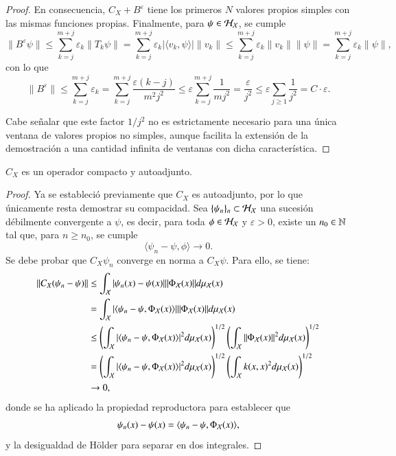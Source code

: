 \begin{proof}
    En consecuencia, $C_X + B^\varepsilon$ tiene los primeros $N$ valores propios simples con las mismas funciones propias. Finalmente, para $\psi \in \mathcal{H}_{\mathcal{X}}$, se cumple
    \[
    \| B^\varepsilon \psi \| \leq \sum_{k=j}^{m+j} \varepsilon_k \| T_k \psi \| = \sum_{k=j}^{m+j} \varepsilon_k | \langle v_k, \psi \rangle | \| v_k \| \leq \sum_{k=j}^{m+j} \varepsilon_k \| v_k \| \| \psi \| = \sum_{k=j}^{m+j} \varepsilon_k \| \psi \|,
    \]
    con lo que
    \[
    \| B^\varepsilon \| \leq \sum_{k=j}^{m+j} \varepsilon_k  = \sum_{k=j}^{m+j} \frac{\varepsilon (k-j)}{m^2 j^2} \leq \varepsilon \sum_{k=j}^{m+j} \frac{1}{m j^2} = \frac{\varepsilon}{j^2} \leq \varepsilon \sum_{j \geq 1} \frac{1}{j^2} = C \cdot \varepsilon.
    \]

    Cabe señalar que este factor $1/j^2$ no es estrictamente necesario para una única ventana de valores propios no simples, aunque facilita la extensión de la demostración a una cantidad infinita de ventanas con dicha característica.
\end{proof}

\begin{lema}
    $C_X$ es un operador compacto y autoadjunto.
\end{lema}

\begin{proof}
    Ya se estableció previamente que $C_X$ es autoadjunto, por lo que únicamente resta demostrar su compacidad. Sea $\{ \psi_n \}_n \subset \mathcal{H}_{\mathcal{X}}$ una sucesión débilmente convergente a $\psi$, es decir, para toda $\phi \in \mathcal{H}_{\mathcal{X}}$ y $\varepsilon > 0$, existe un $n_0 \in \mathbb{N}$ tal que, para $n \geq n_0$, se cumple
    \[
    \langle \psi_n - \psi, \phi \rangle \to 0.
    \]
    Se debe probar que $C_X \psi_n$ converge en norma a $C_X \psi$. Para ello, se tiene:
    \[
    \begin{aligned}
        \| C_X (\psi_n - \psi) \| & \leq \int_{\mathcal{X}} | \psi_n (x) - \psi (x) | \| \Phi_{\mathcal{X}} (x) \| d \mu_{\mathcal{X}} (x) \\
        & = \int_{\mathcal{X}} | \langle \psi_n - \psi, \Phi_{\mathcal{X}} (x) \rangle | \| \Phi_{\mathcal{X}} (x) \| d \mu_{\mathcal{X}} (x) \\
        & \leq \left ( \int_{\mathcal{X}} | \langle \psi_n - \psi, \Phi_{\mathcal{X}} (x) \rangle |^2 d \mu_{\mathcal{X}} (x) \right )^{1/2} \left ( \int_{\mathcal{X}} \| \Phi_{\mathcal{X}} (x) \|^2 d \mu_{\mathcal{X}} (x) \right )^{1/2} \\
        & = \left ( \int_{\mathcal{X}} | \langle \psi_n - \psi, \Phi_{\mathcal{X}} (x) \rangle |^2 d \mu_{\mathcal{X}} (x) \right )^{1/2} \left ( \int_{\mathcal{X}} k(x,x)^2 d \mu_{\mathcal{X}} (x) \right )^{1/2} \\
        & \to 0,
    \end{aligned}
    \]
    donde se ha aplicado la propiedad reproductora para establecer que
    \[
    \psi_n (x) - \psi (x) = \langle \psi_n - \psi, \Phi_{\mathcal{X}} (x) \rangle,
    \]
    y la desigualdad de Hölder para separar en dos integrales.
\end{proof}

